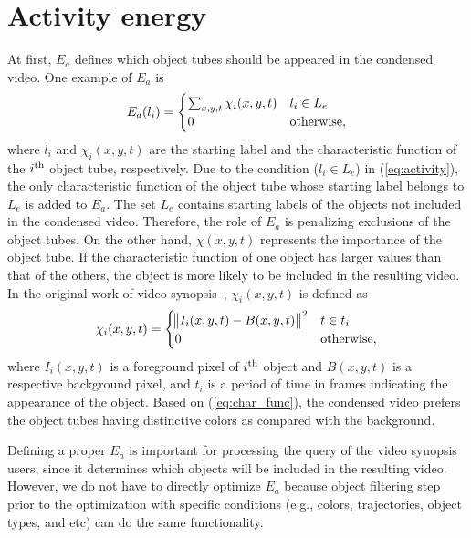 \documentclass[11pt]{hyu_thesis}
\begin{document}
\section{Activity energy}
At first, $E_a$ defines which object tubes should be appeared in the condensed video. One example of $E_a$ is
\begin{equation}
\label{eq:activity}
E_a(l_i) =
\begin{cases}
\sum_{x,y,t} {\chi_i (x,y,t)} & l_i \in L_e \\
0 & \rm{otherwise},
\end{cases}
\end{equation}
where $l_i$ and $\chi_i (x,y,t)$ are the starting label and the characteristic function of the $i^{\rm{th}}$ object tube, respectively. Due to the condition ($l_i \in L_e$) in (\ref{eq:activity}), the only characteristic function of the object tube whose starting label belongs to $L_e$ is added to $E_a$. The set $L_e$ contains starting labels of the objects not included in the condensed video. Therefore, the role of $E_a$ is penalizing exclusions of the object tubes. On the other hand, $\chi (x,y,t)$ represents the importance of the object tube. If the characteristic function of one object has larger values than that of the others, the object is more likely to be included in the resulting video. In the original work of video synopsis~\cite{Rav-Acha2006,Pritch2007,Pritch2008}, $\chi_i (x,y,t)$ is defined as
\begin{equation}
\label{eq:char_func}
\chi_i(x,y,t)=
\begin{cases}
\norm{I_i(x,y,t)-B(x,y,t)}^2 & t \in t_i\\
0 & \rm{otherwise},
\end{cases}
\end{equation}
where $I_i(x,y,t)$ is a foreground pixel of $i^{\rm{th}}$ object and $B(x,y,t)$ is a respective background pixel, and $t_i$ is a period of time in frames indicating the appearance of the object. Based on (\ref{eq:char_func}), the condensed video prefers the object tubes having distinctive colors as compared with the background. 

Defining a proper $E_a$ is important for processing the query of the video synopsis users, since it determines which objects will be included in the resulting video. However, we do not have to directly optimize $E_a$ because object filtering step prior to the optimization with specific conditions (e.g., colors, trajectories, object types, and etc) can do the same functionality.
\end{document}
